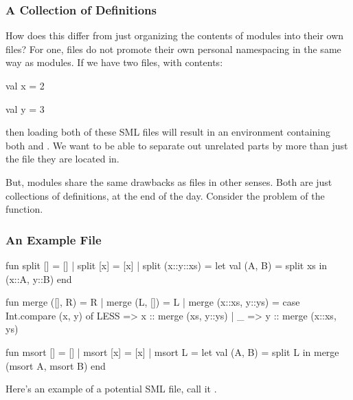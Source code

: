 \documentclass[aspectratio=169]{beamer}
\begin{document}
\begin{frame}[fragile]
  \frametitle{A Collection of Definitions}

  How does this differ from just organizing the contents of modules into
  their own files? For one, files do not promote their own personal
  namespacing in the same way as modules. If we have two files, with contents:

  \begin{codeblock}
    val x = 2
  \end{codeblock}

  \begin{codeblock}
    val y = 3
  \end{codeblock}

  then loading both of these SML files will result in an environment containing
  both  and . We want to be able to separate out unrelated parts
  by more than just the file they are located in.

  \vspace{\fill}

  But, modules share the same drawbacks as files in other senses. Both are just
  collections of definitions, at the end of the day. Consider the problem of 
  the  function.
\end{frame}

\begin{frame}[fragile]
  \frametitle{An Example File}

  {\tiny
  \begin{codeblock}
    fun split [] = []
      | split [x] = [x]
      | split (x::y::xs) = 
          let
            val (A, B) = split xs
          in
            (x::A, y::B)
          end

    fun merge ([], R) = R
      | merge (L, []) = L
      | merge (x::xs, y::ys) =
          case Int.compare (x, y) of
            LESS => x :: merge (xs, y::ys)
          | _ => y :: merge (x::xs, ys)

    fun msort [] = []
      | msort [x] = [x]
      | msort L = 
          let
            val (A, B) = split L 
          in
            merge (msort A, msort B)
          end
  \end{codeblock}
  }

  \vspace{\fill}

  Here's an example of a potential SML file, call it .
\end{frame}
\end{document}
